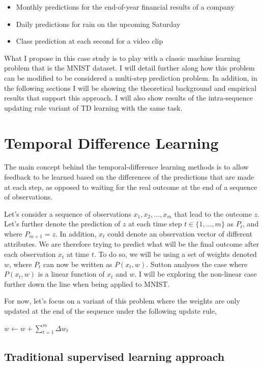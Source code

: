\documentclass{article}
\begin{document}
\begin{itemize}
  \item Monthly predictions for the end-of-year financial results of a company
  \item Daily predictions for rain on the upcoming Saturday
  \item Class prediction at each second for a video clip
\end{itemize}

What I propose in this case study is to play with a classic machine learning problem that is the MNIST dataset. I will detail further along how this problem can be modified to be considered a multi-step prediction problem. In addition, in the following sections I will be showing the theoretical background and empirical results that support this approach. I will also show results of the intra-sequence updating rule variant of TD learning with the same task.

\section{Temporal Difference Learning}

The main concept behind the temporal-difference learning methods is to allow feedback to be learned based on the differences of the predictions that are made at each step, as opposed to waiting for the real outcome at the end of a sequence of observations.

Let's consider a sequence of observations $x_1, x_2, \dots, x_m$ that lead to the outcome $z$. Let's further denote the prediction of $z$ at each time step $t \in \{1, \dots, m\}$ as $P_t$, and where $P_{m+1} = z$. In addition, $x_t$ could denote an observation vector of different attributes. We are therefore trying to predict what will be the final outcome after each observation $x_t$ at time $t$. To do so, we will be using a set of weights denoted $w$, where $P_t$ can now be written as $P(x_t, w)$. Sutton analyses the case where $P(x_t, w)$ is a linear function of $x_t$ and $w$. I will be exploring the non-linear case further down the line when being applied to MNIST.

For now, let's focus on a variant of this problem where the weights are only updated at the end of the sequence under the following update rule,

$w \leftarrow w + \sum \limits_{t=1}^m \Delta w_t$

\subsection{Traditional supervised learning approach}
\end{document}
